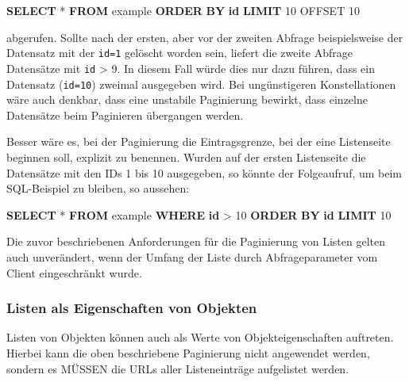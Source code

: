 \documentclass[,a4paper]{article}
\newenvironment{Shaded}{}{}
\newcommand{\KeywordTok}[1]{\textcolor[rgb]{0.00,0.44,0.13}{\textbf{{#1}}}}
\newcommand{\DecValTok}[1]{\textcolor[rgb]{0.25,0.63,0.44}{{#1}}}
\newcommand{\NormalTok}[1]{{#1}}
\begin{document}
\begin{Shaded}
\begin{Highlighting}[]
\KeywordTok{SELECT} \NormalTok{* }\KeywordTok{FROM} \NormalTok{example }\KeywordTok{ORDER} \KeywordTok{BY} \KeywordTok{id} \KeywordTok{LIMIT} \DecValTok{10} \NormalTok{OFFSET }\DecValTok{10}
\end{Highlighting}
\end{Shaded}

abgerufen. Sollte nach der ersten, aber vor der zweiten Abfrage
beispielsweise der Datensatz mit der \texttt{id=1} gelöscht worden sein,
liefert die zweite Abfrage Datensätze mit \texttt{id} \textgreater{} 9.
In diesem Fall würde dies nur dazu führen, dass ein Datensatz
(\texttt{id=10}) zweimal ausgegeben wird. Bei ungünstigeren
Konstellationen wäre auch denkbar, dass eine unstabile Paginierung
bewirkt, dass einzelne Datensätze beim Paginieren übergangen werden.

Besser wäre es, bei der Paginierung die Eintragsgrenze, bei der eine
Listenseite beginnen soll, explizit zu benennen. Wurden auf der ersten
Listenseite die Datensätze mit den IDs 1 bis 10 ausgegeben, so könnte
der Folgeaufruf, um beim SQL-Beispiel zu bleiben, so aussehen:

\begin{Shaded}
\begin{Highlighting}[]
\KeywordTok{SELECT} \NormalTok{* }\KeywordTok{FROM} \NormalTok{example }\KeywordTok{WHERE} \KeywordTok{id} \NormalTok{> }\DecValTok{10} \KeywordTok{ORDER} \KeywordTok{BY} \KeywordTok{id} \KeywordTok{LIMIT} \DecValTok{10}
\end{Highlighting}
\end{Shaded}

Die zuvor beschriebenen Anforderungen für die Paginierung von Listen
gelten auch unverändert, wenn der Umfang der Liste durch
Abfrageparameter vom Client eingeschränkt wurde.

\subsubsection{Listen als Eigenschaften von
Objekten}\label{listen-als-eigenschaften-von-objekten}

Listen von Objekten können auch als Werte von Objekteigenschaften
auftreten. Hierbei kann die oben beschriebene Paginierung nicht
angewendet werden, sondern es MÜSSEN die URLs aller Listeneinträge
aufgelistet werden.
\end{document}
